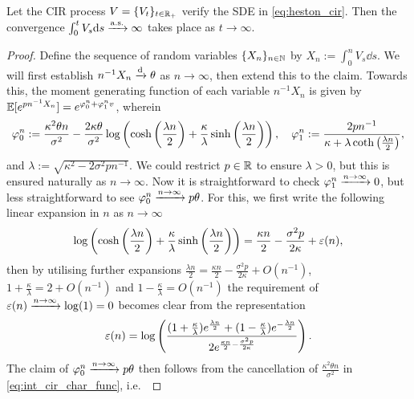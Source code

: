 \begin{lemma}\label{lem:int_cir_unbound}
    Let the CIR process $V=\{V_t\}_{t\in\mathbb{R}_+}$ verify the SDE in \autoref{eq:heston_cir}. Then the convergence $\int_0^t V_s\mathrm{d} s\xrightarrow{\mathrm{a.s.}}\infty$ takes place as $t\to\infty$.
\end{lemma}
\begin{proof}
    Define the sequence of random variables $\{X_n\}_{n\in\mathbb{N}}$ by $X_n:=\int_0^n V_s\dd s$. We will first establish $n^{-1}{X_n}\xrightarrow{\mathrm{d}} \theta$ as $n\to\infty$, then extend this to the claim. Towards this, the moment generating function of each variable $n^{-1}{X_n}$ is given by $\mathbb{E}[e^{pn^{-1}X_n}] = e^{\varphi_0^n + \varphi_1^n v}$, wherein
    \begin{equation}\label{eq:int_cir_char_func}
        \varphi_0^n:=\frac{\kappa^2\theta n}{\sigma^2}- \frac{2\kappa\theta}{\sigma^2}\log\left(\cosh\left(\frac{\lambda n}{2}\right) + \frac{\kappa}{\lambda}\sinh\left(\frac{\lambda n}{2}\right)\right),\quad \varphi_1^n:= \frac{2pn^{-1}}{\kappa + \lambda\coth\left(\frac{\lambda n}{2}\right)},
    \end{equation}
    and $\lambda := \sqrt{\kappa^2-2\sigma^2pn^{-1}}$. We could restrict $p\in\mathbb{R}$ to ensure $\lambda>0$, but this is ensured naturally as $n\to\infty$. Now it is straightforward to check $\varphi_1^n\xrightarrow{n\to\infty}0$, but less straightforward to see $\varphi_0^n\xrightarrow{n\to\infty}p\theta$. For this, we first write the following linear expansion in $n$ as $n\to\infty$~
    \begin{equation}\label{eq:expansion}
        \log\left(\cosh\left(\frac{\lambda n}{2}\right) + \frac{\kappa}{\lambda}\sinh\left(\frac{\lambda n}{2}\right)\right) = \frac{\kappa n}{2} - \frac{\sigma^2 p}{2\kappa} + \varepsilon(n),
    \end{equation}
    then by utilising further expansions $\frac{\lambda n}{2} = \frac{\kappa n}{2} - \frac{\sigma^2 p}{2\kappa} + O(n^{-1})$, $1+\frac{\kappa}{\lambda} = 2 + O(n^{-1})$ and $1-\frac{\kappa}{\lambda} = O(n^{-1})$ the requirement of $\varepsilon(n)\xrightarrow{n\to\infty}\log(1)=0$ becomes clear from the representation
    \begin{equation}\label{eq:error_estimate}
        \varepsilon(n)=\log\left(\frac{(1+\frac{\kappa}{\lambda})e^{\frac{\lambda n}{2}} + (1 -\frac{\kappa}{\lambda})e^{-\frac{\lambda n}{2}}}{2e^{\frac{\kappa n}{2} - \frac{\sigma^2 p}{2\kappa}}}\right).
    \end{equation}
    The claim of $\varphi_0^n\xrightarrow{n\to\infty}p\theta$ then follows from the cancellation of $\frac{\kappa^2\theta n}{\sigma^2}$ in \autoref{eq:int_cir_char_func}, i.e.~

\end{proof}
